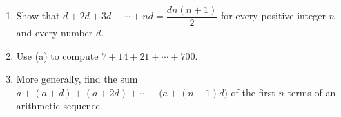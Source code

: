 \begin{enumerate}
\item[(a)] Show that $d+2d+3d+\cdots+nd=\dfrac{dn(n+1)}{2}$ for every positive integer $n$ and every number $d$.
\item[(b)] Use (a) to compute $7+14+21+\cdots+700$.
\item[(c)] More generally, find the sum $a+(a+d)+(a+2d)+\cdots+\bigl(a+(n-1)d\bigr)$ of the first $n$ terms of an arithmetic sequence.
\end{enumerate}
